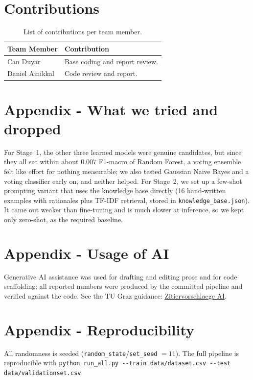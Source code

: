 \documentclass[12pt,a4paper,twocolumn]{article}
\begin{document}
\section*{Contributions}
\begin{table}[h!]
\centering
\caption{List of contributions per team member.}
\label{tab:contributions}
\begin{tabular}{lp{4.5cm}}
\toprule
\textbf{Team Member} & \textbf{Contribution} \\
\midrule
Can Duyar       & Base coding and report review. \\
Daniel Ainikkal & Code review and report.        \\
\bottomrule
\end{tabular}
\end{table}

\clearpage



\appendix

\section{Appendix - What we tried and dropped}
For Stage~1, the other three learned models were genuine candidates, but since
they all sat within about \num{0.007} F1-macro of Random Forest, a voting
ensemble felt like effort for nothing measurable; we also tested Gaussian Naive
Bayes and a voting classifier early on, and neither helped. For Stage~2, we set
up a few-shot prompting variant that uses the knowledge base directly (16
hand-written examples with rationales plus TF-IDF retrieval, stored in
\texttt{knowledge\_base.json}). It came out weaker than fine-tuning and is much
slower at inference, so we kept only zero-shot, as the required baseline.

\section{Appendix - Usage of AI}
Generative AI assistance was used for drafting and editing prose and for code
scaffolding; all reported numbers were produced by the committed pipeline and
verified against the code. See the TU Graz guidance:
\href{https://www.tugraz.at/fileadmin/Studierende\_und\_Bedienstete/Information/Unsere\_TU\_Graz/Lehre\_an\_der\_TU\_Graz/Zitiervorschlaege_KI.pdf}{Zitiervorschlaege AI}.

\section{Appendix - Reproducibility}
All randomness is seeded (\texttt{random\_state}/\texttt{set\_seed} $=11$). The
full pipeline is reproducible with
\texttt{python run\_all.py -{}-train data/dataset.csv -{}-test
data/validationset.csv}.
\end{document}
